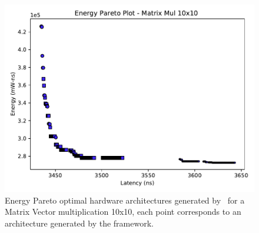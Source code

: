\begin{figure}[tb] 
\centering
\includegraphics[width=\columnwidth]{graphs/EnergyParetoMatrixMul10.pdf}
    \caption{\small Energy Pareto optimal hardware architectures generated by \frameworkname~for a Matrix Vector multiplication 10x10, each point corresponds to an architecture generated by the framework.}
\label{fig:sram_vs_mram_pareto_mul}
\end{figure}

